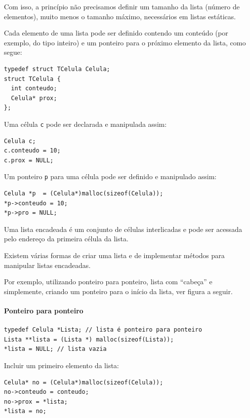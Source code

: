 \documentclass[12pt,a4paper]{article}
\begin{document}
Com isso, a princípio não precisamos definir um tamanho da lista (número
de elementos), muito menos o tamanho máximo, necessários em listas
estáticas.

Cada elemento de uma lista pode ser definido contendo um conteúdo (por
exemplo, do tipo inteiro) e um ponteiro para o próximo elemento da
lista, como segue:

\begin{verbatim}
typedef struct TCelula Celula;
struct TCelula {
  int conteudo;
  Celula* prox;
};
\end{verbatim}

Uma célula \texttt{c} pode ser declarada e manipulada assim:

\begin{verbatim}
Celula c;
c.conteudo = 10;
c.prox = NULL;
\end{verbatim}

Um ponteiro \texttt{p} para uma célula pode ser definido e manipulado
assim:

\begin{verbatim}
Celula *p  = (Celula*)malloc(sizeof(Celula));
*p->conteudo = 10;
*p->pro = NULL;
\end{verbatim}

Uma lista encadeada é um conjunto de células interlicadas e pode ser
acessada pelo endereço da primeira célula da lista.

Existem várias formas de criar uma lista e de implementar métodos para
manipular listas encadeadas.

Por exemplo, utilizando ponteiro para ponteiro, lista com ``cabeça'' e
simplemente, criando um ponteiro para o início da lista, ver figura a
seguir.

    \hypertarget{ponteiro-para-ponteiro}{%
\paragraph{Ponteiro para ponteiro}\label{ponteiro-para-ponteiro}}

\begin{verbatim}
typedef Celula *Lista; // lista é ponteiro para ponteiro
Lista **lista = (Lista *) malloc(sizeof(Lista));
*lista = NULL; // lista vazia
\end{verbatim}

Incluir um primeiro elemento da lista:

\begin{verbatim}
Celula* no = (Celula*)malloc(sizeof(Celula));
no->conteudo = conteudo;
no->prox = *lista;
*lista = no;
\end{verbatim}
\end{document}
